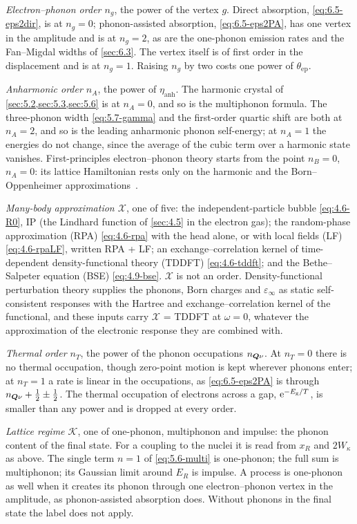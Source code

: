 \emph{Electron--phonon order $n_g$}, the power of the vertex $g$. Direct absorption, \cref{eq:6.5-eps2dir}, is at $n_g = 0$; phonon-assisted absorption, \cref{eq:6.5-eps2PA}, has one vertex in the amplitude and is at $n_g = 2$, as are the one-phonon emission rates and the Fan--Migdal widths of \cref{sec:6.3}. The vertex itself is of first order in the displacement and is at $n_g = 1$. Raising $n_g$ by two costs one power of $\theta_{\mathrm{ep}}$.

\emph{Anharmonic order $n_A$}, the power of $\eta_{\mathrm{anh}}$. The harmonic crystal of \cref{sec:5.2,sec:5.3,sec:5.6} is at $n_A = 0$, and so is the multiphonon formula. The three-phonon width \cref{eq:5.7-gamma} and the first-order quartic shift are both at $n_A = 2$, and so is the leading anharmonic phonon self-energy; at $n_A = 1$ the energies do not change, since the average of the cubic term over a harmonic state vanishes. First-principles electron--phonon theory starts from the point $n_B = 0$, $n_A = 0$: its lattice Hamiltonian rests only on the harmonic and the Born--Oppenheimer approximations~\cite[Sect.~III\,A, text after Eq.~(19)]{giustino2017electron}.

\emph{Many-body approximation $\mathcal{X}$}, one of five: the independent-particle bubble \cref{eq:4.6-R0}, IP (the Lindhard function of \cref{sec:4.5} in the electron gas); the random-phase approximation (RPA) \cref{eq:4.6-rpa} with the head alone, or with local fields (LF) \cref{eq:4.6-rpaLF}, written RPA + LF; an exchange--correlation kernel of time-dependent density-functional theory (TDDFT) \cref{eq:4.6-tddft}; and the Bethe--Salpeter equation (BSE) \cref{eq:4.9-bse}. $\mathcal{X}$ is not an order. Density-functional perturbation theory supplies the phonons, Born charges and $\varepsilon_\infty$ as static self-consistent responses with the Hartree and exchange--correlation kernel of the functional, and these inputs carry $\mathcal{X}$ = TDDFT at $\omega = 0$, whatever the approximation of the electronic response they are combined with.

\emph{Thermal order $n_T$}, the power of the phonon occupations $n_{\bm{Q}\nu}$. At $n_T = 0$ there is no thermal occupation, though zero-point motion is kept wherever phonons enter; at $n_T = 1$ a rate is linear in the occupations, as \cref{eq:6.5-eps2PA} is through $n_{\bm{Q}\nu} + \frac12 \pm \frac12$. The thermal occupation of electrons across a gap, $\mathrm{e}^{-E_{\mathrm{g}}/T}$, is smaller than any power and is dropped at every order.

\emph{Lattice regime $\mathcal{K}$}, one of one-phonon, multiphonon and impulse: the phonon content of the final state. For a coupling to the nuclei it is read from $x_R$ and $2W_\kappa$ as above. The single term $n = 1$ of \cref{eq:5.6-multi} is one-phonon; the full sum is multiphonon; its Gaussian limit around $E_R$ is impulse. A process is one-phonon as well when it creates its phonon through one electron--phonon vertex in the amplitude, as phonon-assisted absorption does. Without phonons in the final state the label does not apply.

